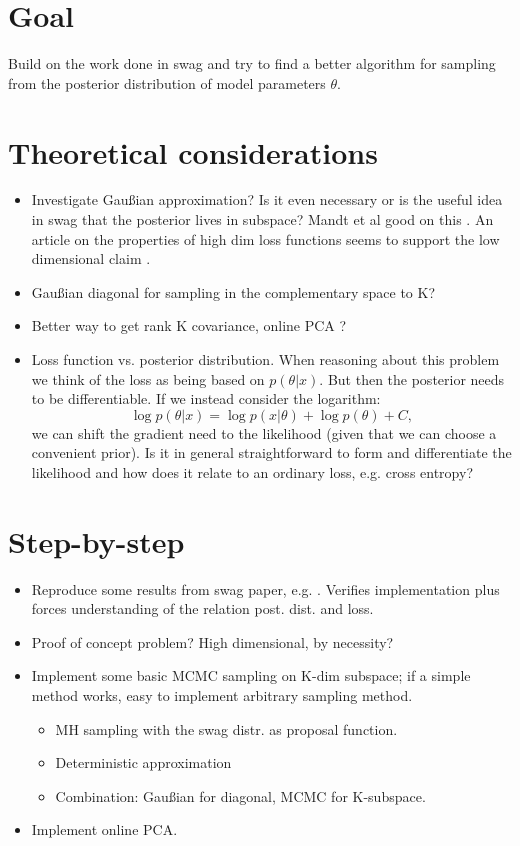 \section{Goal}
Build on the work done in swag \cite{swag} and try to find a better algorithm for sampling from the posterior distribution of model parameters $\theta$.

\section{Theoretical considerations}
\begin{itemize}
    \item{Investigate Gaußian approximation? Is it even necessary or is the useful idea in swag that the posterior lives in subspace? Mandt et al good on this \cite{mandt}. An article on the properties of high dim loss functions seems to support the low dimensional claim \cite{visual_loss}.}
    \item{Gaußian diagonal for sampling in the complementary space to K?}
    \item{Better way to get rank K covariance, online PCA \cite{online_pca}?}
    \item{Loss function vs. posterior distribution. When reasoning about this problem we think of the loss as being based on $p(\theta|x)$. But then the posterior needs to be differentiable. If we instead consider the logarithm: 
    \begin{equation}
        \log p(\theta | x) = \log p(x | \theta) + \log p(\theta) + C,
    \end{equation}
    we can shift the gradient need to the likelihood (given that we can choose a convenient prior). Is it in general straightforward to form and differentiate the likelihood and how does it relate to an ordinary loss, e.g. cross entropy? 
    }
\end{itemize}

\section{Step-by-step}
\begin{itemize}
    \item{Reproduce some results from swag paper, e.g. \cite[Fig. 5]{swag}. Verifies implementation plus forces understanding of the relation post. dist. and loss.}
    \item{Proof of concept problem? High dimensional, by necessity?}
    \item{Implement some basic MCMC sampling on K-dim subspace; if a simple method works, easy to implement arbitrary sampling method.}
    \begin{itemize}
        \item MH sampling with the swag distr. as proposal function.
        \item{Deterministic approximation \cite{determ_mcmc}}
        \item{Combination: Gaußian for diagonal, MCMC for K-subspace.}
    \end{itemize}
    \item Implement online PCA.
\end{itemize}